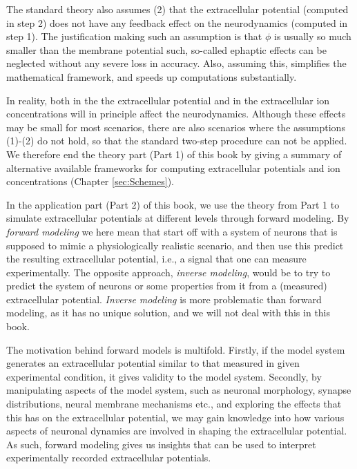 The standard theory also assumes (2) that the extracellular potential (computed in step 2) does not have any feedback effect on the neurodynamics (computed in step 1). The justification making such an assumption is that $\phi$ is usually so much smaller than the membrane potential such, so-called ephaptic effects can be neglected without any severe loss in accuracy. Also, assuming this, simplifies the mathematical framework, and speeds up computations substantially. 

In reality, both in the the extracellular potential and in the extracellular ion concentrations will in principle affect the neurodynamics. Although these effects may be small for most scenarios, there are also scenarios where the assumptions (1)-(2) do not hold, so that the standard two-step procedure can not be applied. We therefore end the theory part (Part 1) of this book by giving a summary of alternative available frameworks for computing extracellular potentials and ion concentrations (Chapter \ref{sec:Schemes}).

In the application part (Part 2) of this book, we use the theory from Part 1 to simulate extracellular potentials at different levels through forward modeling. By \textit{forward modeling} we here mean that start off with a system of neurons that is supposed to mimic a physiologically realistic scenario, and then use this predict the resulting extracellular potential, i.e., a signal that one can measure experimentally. The opposite approach, \textit{inverse modeling}, would be to try to predict the system of neurons or some properties from it from a (measured) extracellular potential. \textit{Inverse modeling} is more problematic than forward modeling, as it has no unique solution, and we will not deal with this in this book.

The motivation behind forward models is multifold. Firstly, if the model system generates an extracellular potential similar to that measured in given experimental condition, it gives validity to the model system. Secondly, by manipulating aspects of the model system, such as neuronal morphology, synapse distributions, neural membrane mechanisms etc., and exploring the effects that this has on the extracellular potential, we may gain knowledge into how various aspects of neuronal dynamics are involved in shaping the extracellular potential. As such, forward modeling gives us insights that can be used to interpret experimentally recorded extracellular potentials. 

